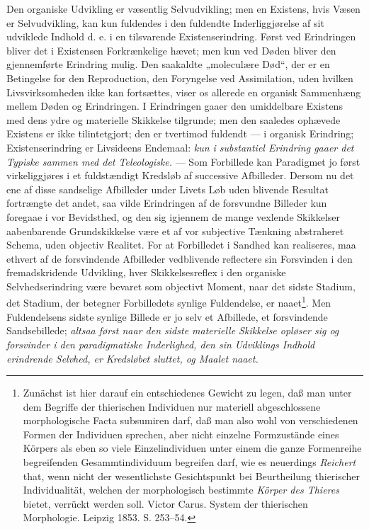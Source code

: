 \documentclass[11pt]{book}
\newcommand{\opage}[1]{\marginnote{\footnotesize\textit{[#1]}}}
\begin{document}
Den organiske Udvikling er væsentlig Selvudvikling; men en Existens, hvis
Væsen er Selvudvikling, kan kun fuldendes i den fuldendte Inderliggjørelse
af sit udviklede Indhold d. e. i en tilsvarende Existenserindring. Først ved
Erindringen bliver det i Existensen Forkrænkelige hævet; men kun ved Døden
bliver den gjennemførte Erindring mulig. Den saakaldte „moleculære Død“, der
er en Betingelse for den Reproduction, den Foryngelse ved Assimilation, uden
hvilken Livsvirksomheden ikke kan fortsættes, viser os allerede en organisk
Sammenhæng mellem Døden og Erindringen. I Erindringen gaaer den umiddelbare
Existens med dens ydre og materielle Skikkelse tilgrunde; men den saaledes
ophævede Existens er ikke tilintetgjort; den er tvertimod fuldendt --- i
organisk Erindring; Existenserindring er Livsideens Endemaal: \emph{kun i
substantiel Erindring gaaer det Typiske sammen med det Teleologiske.} ---
Som Forbillede kan Paradigmet jo først virkeliggjøres i et fuldstændigt
Kredsløb af successive Afbilleder. Dersom nu det ene af disse sandselige
Afbilleder under Livets Løb uden blivende Resultat fortrængte det andet, saa
vilde Erindringen af de forsvundne Billeder kun foregaae i vor Bevidsthed,
og den sig igjennem de mange vexlende Skikkelser aabenbarende
Grundskikkelse være et af vor subjective Tænkning abstraheret Schema, uden
objectiv Realitet. For at Forbilledet i Sandhed kan realiseres, maa ethvert
af de forsvindende Afbilleder vedblivende reflectere sin Forsvinden i den
fremadskridende Udvikling, hver Skikkelsesreflex i den organiske
Selvhedserindring være bevaret som objectivt Moment, naar det sidste
Stadium, det Stadium, der betegner Forbilledets
\opage{284} \setcounter{footnote}{0}%
synlige Fuldendelse, er naaet\footnote{%
Zunächst ist hier darauf ein entschiedenes Gewicht zu legen, daß man unter
dem Begriffe der thierischen Individuen nur materiell abgeschlossene
morphologische Facta subsumiren darf, daß man also wohl von verschiedenen
Formen der Individuen sprechen, aber nicht einzelne Formzustände eines
Körpers als eben so viele Einzelindividuen unter einem die ganze
Formenreihe begreifenden Gesammtindividuum begreifen darf, wie es
neuerdings \emph{Reichert} that, wenn nicht der wesentlichste Gesichtspunkt
bei Beurtheilung thierischer Individualität, welchen der morphologisch
bestimmte \emph{Körper des Thieres} bietet, verrückt werden soll. Victor
Carus. System der thierischen Morphologie. Leipzig 1853. S. 253--54.}. Men
Fuldendelsens sidste synlige Billede er jo selv et Afbillede, et
forsvindende Sandsebillede; \emph{altsaa først naar den sidste materielle
Skikkelse opløser sig og forsvinder i den paradigmatiske Inderlighed, den
sin Udviklings Indhold erindrende Selvhed, er Kredsløbet sluttet, og Maalet
naaet.}
\end{document}
